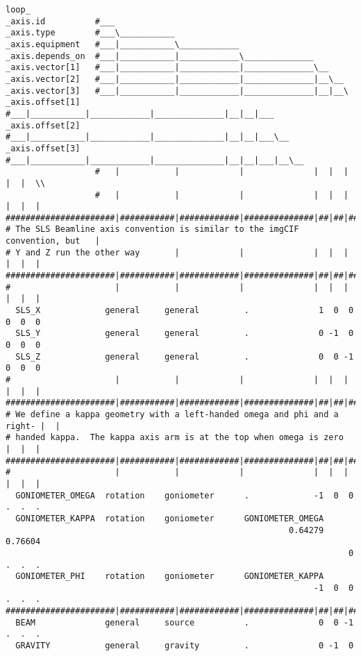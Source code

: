 \documentclass[11pt]{article}
\begin{document}
\footnotesize{\begin{verbatim}
loop_
_axis.id          #___
_axis.type        #___\___________
_axis.equipment   #___|___________\____________
_axis.depends_on  #___|___________|____________\______________
_axis.vector[1]   #___|___________|____________|______________\__
_axis.vector[2]   #___|___________|____________|______________|__\__
_axis.vector[3]   #___|___________|____________|______________|__|__\
_axis.offset[1]   #___|___________|____________|______________|__|__|___
_axis.offset[2]   #___|___________|____________|______________|__|__|___\__
_axis.offset[3]   #___|___________|____________|______________|__|__|___|__\__
                  #   |           |            |              |  |  |   |  |  \\
                  #   |           |            |              |  |  |   |  |  |
######################|###########|############|##############|##|##|###|##|##|
# The SLS Beamline axis convention is similar to the imgCIF convention, but   |
# Y and Z run the other way       |            |              |  |  |   |  |  |
######################|###########|############|##############|##|##|###|##|##|
#                     |           |            |              |  |  |   |  |  |
  SLS_X             general     general         .              1  0  0 0  0  0
  SLS_Y             general     general         .              0 -1  0 0  0  0
  SLS_Z             general     general         .              0  0 -1 0  0  0
#                     |           |            |              |  |  |   |  |  |
######################|###########|############|##############|##|##|###|##|##|
# We define a kappa geometry with a left-handed omega and phi and a right- |  |
# handed kappa.  The kappa axis arm is at the top when omega is zero    |  |  |
######################|###########|############|##############|##|##|###|##|##|
#                     |           |            |              |  |  |   |  |  |
  GONIOMETER_OMEGA  rotation    goniometer      .             -1  0  0  .  .  .
  GONIOMETER_KAPPA  rotation    goniometer      GONIOMETER_OMEGA
                                                         0.64279 0.76604
                                                                     0  .  .  .
  GONIOMETER_PHI    rotation    goniometer      GONIOMETER_KAPPA
                                                              -1  0  0  .  .  .
######################|###########|############|##############|##|##|###|##|##|
  BEAM              general     source          .              0  0 -1
.  .  .
  GRAVITY           general     gravity         .              0 -1  0

\end{verbatim}}
\end{document}
